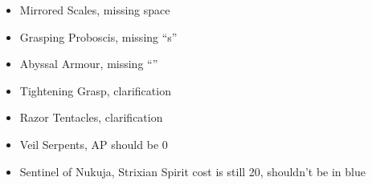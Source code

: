 \begin{itemize}
	\item Mirrored Scales, missing space
	\item Grasping Proboscis, missing \enquote{s}
	\item Abyssal Armour, missing \enquote{\minuss{}}
	\item Tightening Grasp, clarification
	\item Razor Tentacles, clarification
\end{itemize}

\subtitle{2.3.1}

\begin{itemize}
	\item Veil Serpents, AP should be 0
	\item Sentinel of Nukuja, Strixian Spirit cost is still 20, shouldn't be in blue
\end{itemize}


